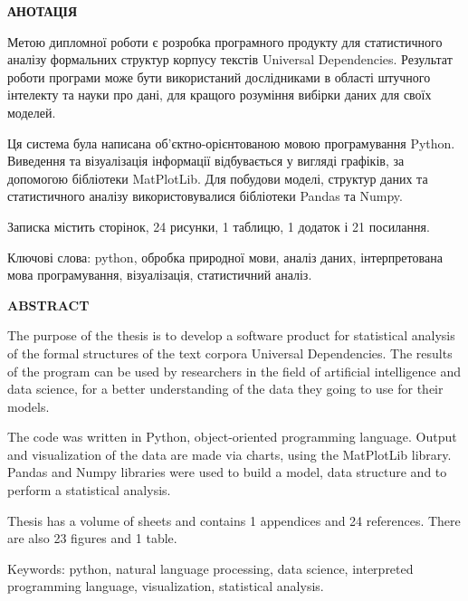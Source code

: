 \thispagestyle{empty}
\begin{center}
\textbf{\Large АНОТАЦІЯ}
\end{center}

Метою дипломної роботи є розробка програмного продукту для статистичного
аналізу формальних структур корпусу текстів Universal Dependencies.
Результат роботи програми може бути використаний дослідниками в області
штучного інтелекту та науки про дані, для кращого розуміння вибірки даних
для своїх моделей. 

Ця система була написана об’єктно-орієнтованою мовою програмування Python.
Виведення та візуалізація інформації відбувається у вигляді графіків, за
допомогою бібліотеки MatPlotLib. Для побудови моделі, структур даних
та статистичного аналізу використовувалися бібліотеки Pandas та Numpy.

Записка містить \pageref{LastPage} сторінок, 24 рисунки, 1 таблицю, 1 додаток і 21 посилання.

Ключові слова: python, обробка природної мови, аналіз даних, інтерпретована мова програмування, візуалізація, статистичний аналіз.

\newpage
\thispagestyle{empty}

\begin{center}
\textbf{\Large ABSTRACT}
\end{center}

The purpose of the thesis is to develop a software product for statistical
analysis of the formal structures of the text corpora Universal Dependencies.
The results of the program can be used by researchers in the field of
artificial intelligence and data science, for a better understanding of the data they going to use for their models.

The code was written in Python, object-oriented programming language.
Output and visualization of the data are made via charts, using the MatPlotLib library. Pandas and Numpy libraries were used to build a model, data structure
and to perform a statistical analysis.

Thesis has a volume of \pageref{LastPage} sheets and contains 1 appendices and 24 references. There are also 23 figures and 1 table.

Keywords: python, natural language processing, data science, interpreted programming language, visualization, statistical analysis.